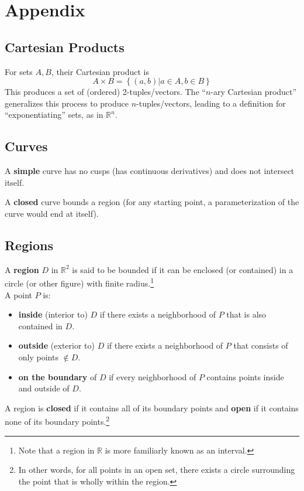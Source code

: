 \documentclass{article}
\begin{document}
\section{Appendix}
\subsection{Cartesian Products} \label{set-multiplication}
For sets $A, B$, their Cartesian product is $$A \times B = \left\{ (a,b) | a \in A, b \in B\right\}$$
This produces a set of (ordered) 2-tuples/vectors.
The ``$n$-ary Cartesian product'' generalizes this process to produce $n$-tuples/vectors, leading to a definition for ``exponentiating'' sets, as in $\mathbb{R}^n$.

\subsection{Curves}
A \textbf{simple} curve has no cusps (has continuous derivatives) and does not intersect itself.

A \textbf{closed} curve bounds a region (for any starting point, a parameterization of the curve would end at itself).

\subsection{Regions} \label{regions}
A \textbf{region} $D$ in $\mathbb{R}^2$ is said to be bounded if it can be enclosed (or contained) in a circle (or other figure) with finite radius.\footnote{Note that a region in $\mathbb{R}$ is more familiarly known as an interval.}\\
A point $P$ is:
\begin{itemize}
    \item \textbf{inside} (interior to) $D$ if there exists a neighborhood of $P$ that is also contained in $D$.
    \item \textbf{outside} (exterior to) $D$ if there exists a neighborhood of $P$ that consists of only points $\notin D$.
    \item \textbf{on the boundary} of $D$ if every neighborhood of $P$ contains points inside and outside of $D$.
\end{itemize}
A region is \textbf{closed} if it contains all of its boundary points and \textbf{open} if it contains none of its boundary points.\footnote{In other words, for all points in an open set, there exists a circle surrounding the point that is wholly within the region.}
\end{document}
